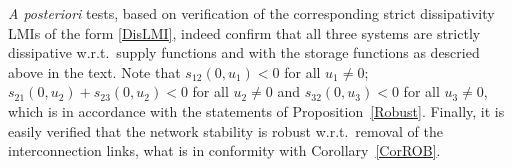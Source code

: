 \documentclass[11pt,a4paper,oneside,DIV=12,headings=small]{scrartcl}
\theoremstyle{plain}
\begin{document}
\emph{A posteriori} tests, based on verification of the corresponding strict dissipativity LMIs of the form \eqref{DisLMI}, indeed confirm that all three systems are strictly dissipative w.r.t.\ supply functions and with the storage functions as descried above in the text. Note that $s_{12}(0,u_1)<0$ for all $u_1 \neq 0$; $s_{21}(0,u_2)+s_{23}(0,u_2) < 0$ for all $u_2 \neq 0$ and $s_{32}(0,u_3)<0$ for all $u_3 \neq 0$, which is in accordance with the statements of Proposition~\ref{Robust}. Finally, it is easily verified that the network stability is robust w.r.t.\ removal of the interconnection links, what is in conformity with Corollary~\ref{CorROB}.     


%

%
%
\end{document}
